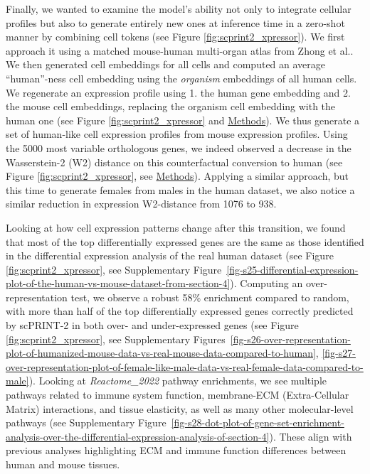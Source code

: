 Finally, we wanted to examine the model's ability not only to integrate
cellular profiles but also to generate entirely new ones at inference
time in a zero-shot manner by combining cell tokens (see Figure \ref{fig:scprint2_xpressor}). We
first approach it using a matched mouse-human multi-organ atlas from
Zhong et al.\citep{zhongBenchmarkingCrossspeciesSinglecell2025}. We then generated cell embeddings for
all cells and computed an average ``human''-ness cell embedding using
the \emph{organism} embeddings of all human cells. We regenerate an
expression profile using 1. the human gene embedding and 2. the mouse
cell embeddings, replacing the organism cell embedding with the human
one (see Figure \ref{fig:scprint2_xpressor} and \hyperref[generative-task]{Methods}). We
thus generate a set of human-like cell expression profiles from mouse
expression profiles. Using the 5000 most variable orthologous genes, we
indeed observed a decrease in the Wasserstein-2 (W2) distance on this
counterfactual conversion to human (see Figure \ref{fig:scprint2_xpressor}, see
\hyperref[scrna-seq-datasets-distances]{Methods})\citep{flamaryPOTPythonOptimal2021,peyreComputationalOptimalTransport2020}.
Applying a similar approach, but this time to generate females from
males in the human dataset, we also notice a similar reduction in
expression W2-distance from 1076 to 938.

Looking at how cell expression patterns change after this transition, we
found that most of the top differentially expressed genes are the same
as those identified in the differential expression analysis of the real
human dataset (see Figure \ref{fig:scprint2_xpressor}, see Supplementary Figure~\ref{fig-s25-differential-expression-plot-of-the-human-vs-mouse-dataset-from-section-4}). Computing an
over-representation test, we observe a robust 58\% enrichment compared
to random, with more than half of the top differentially expressed genes
correctly predicted by \gls{scPRINT}-2 in both over- and under-expressed genes
(see Figure \ref{fig:scprint2_xpressor}, see Supplementary Figures~\ref{fig-s26-over-representation-plot-of-humanized-mouse-data-vs-real-mouse-data-compared-to-human}, \ref{fig-s27-over-representation-plot-of-female-like-male-data-vs-real-female-data-compared-to-male}). Looking at
\emph{Reactome\_2022} pathway enrichments, we see multiple pathways
related to immune system function, membrane-\gls{ECM} (Extra-Cellular Matrix)
interactions, and tissue elasticity, as well as many other
molecular-level pathways (see Supplementary Figure~\ref{fig-s28-dot-plot-of-gene-set-enrichment-analysis-over-the-differential-expression-analysis-of-section-4}). These align with
previous analyses highlighting \gls{ECM} and immune function differences
between human and mouse tissues\citep{wangComparativeAnalysisHuman2024,heGenomicPerspectiveAging2023}.

